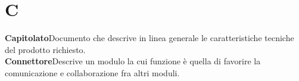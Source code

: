 \newpage
\section{C}\label{l:C}
\textbf{Capitolato}\newline Documento che descrive in linea generale le caratteristiche tecniche del prodotto richiesto.\\
\newline
\textbf{Connettore}\newline Descrive un modulo la cui funzione è quella di favorire la comunicazione e collaborazione fra altri moduli.
